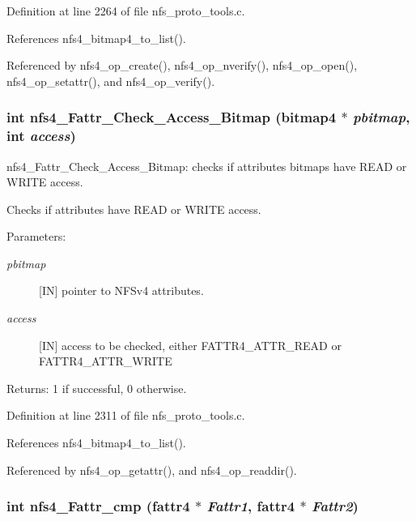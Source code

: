 Definition at line 2264 of file nfs\_\-proto\_\-tools.c.

References nfs4\_\-bitmap4\_\-to\_\-list().

Referenced by nfs4\_\-op\_\-create(), nfs4\_\-op\_\-nverify(), nfs4\_\-op\_\-open(), nfs4\_\-op\_\-setattr(), and nfs4\_\-op\_\-verify().
\subsubsection{\setlength{\rightskip}{0pt plus 5cm}int nfs4\_\-Fattr\_\-Check\_\-Access\_\-Bitmap (bitmap4 $\ast$ {\em pbitmap}, int {\em access})}\label{nfs__proto__tools_8c_a21}


nfs4\_\-Fattr\_\-Check\_\-Access\_\-Bitmap: checks if attributes bitmaps have READ or WRITE access.

Checks if attributes have READ or WRITE access.

\begin{Desc}
\item[Parameters:]
\begin{description}
\item[{\em pbitmap}][IN] pointer to NFSv4 attributes. \item[{\em access}][IN] access to be checked, either FATTR4\_\-ATTR\_\-READ or FATTR4\_\-ATTR\_\-WRITE\end{description}
\end{Desc}
\begin{Desc}
\item[Returns:]1 if successful, 0 otherwise. \end{Desc}


Definition at line 2311 of file nfs\_\-proto\_\-tools.c.

References nfs4\_\-bitmap4\_\-to\_\-list().

Referenced by nfs4\_\-op\_\-getattr(), and nfs4\_\-op\_\-readdir().
\subsubsection{\setlength{\rightskip}{0pt plus 5cm}int nfs4\_\-Fattr\_\-cmp (fattr4 $\ast$ {\em Fattr1}, fattr4 $\ast$ {\em Fattr2})}\label{nfs__proto__tools_8c_a24}


